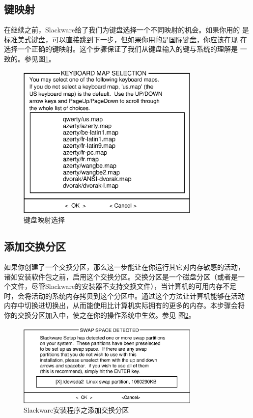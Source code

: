 \subsection{键映射}
\label{sec:installation:setup:keymap}

在继续之前，Slackware给了我们为键盘选择一个不同映射的机会。如果你用的
是标准美式键盘，可以直接跳到下一步，但如果你用的是国际键盘，你应该在现
在选择一个正确的键映射。这个步骤保证了我们从键盘输入的键与系统的理解是
一致的。参见图\ref{fig:setup-keymap}。

\begin{figure}[htpb]
  \centering
  \includegraphics[width=0.8\textwidth]{images/installation/setup-keymap.eps}
  \caption{键盘映射选择}
  \label{fig:setup-keymap}
\end{figure}

\subsection{添加交换分区}
\label{sec:installation:setup:addSwap}

如果你创建了一个交换分区，那么这一步能让在你运行其它对内存敏感的活动，
诸如安装软件包之前，启用这个交换分区。交换分区是一个磁盘分区（或者是一
个文件，尽管Slackware的安装器不支持交换文件），当计算机的可用内存不足
时，会将活动的系统内存拷贝到这个分区中。通过这个方法让计算机能够在活动
内存中切换进切换出，从而能使用比计算机实际拥有的更多的内存。本步骤会将
你的交换分区加入中，使之在你的操作系统中生效。参见
图\ref{fig:setup-swap}。
\begin{figure}[htpb]
  \centering
  \includegraphics[width=0.8\textwidth]{images/installation/setup-swap}
  \caption{Slackware安装程序之添加交换分区}
  \label{fig:setup-swap}
\end{figure}

